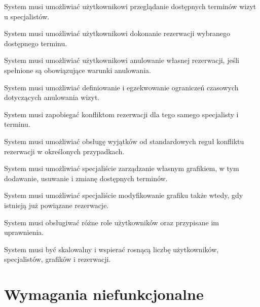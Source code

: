 \documentclass[12pt,a4paper]{article}
\begin{document}
\begin{description}[leftmargin=1.8cm, labelwidth=1.3cm, labelsep=0.5cm, style=nextline]
  \item[FR1] System musi umożliwiać użytkownikowi przeglądanie dostępnych terminów wizyt u specjalistów.
  \item[FR2] System musi umożliwiać użytkownikowi dokonanie rezerwacji wybranego dostępnego terminu.
  \item[FR3] System musi umożliwiać użytkownikowi anulowanie własnej rezerwacji, jeśli spełnione są obowiązujące warunki anulowania.
  \item[FR4] System musi umożliwiać definiowanie i egzekwowanie ograniczeń czasowych dotyczących anulowania wizyt.
  \item[FR5] System musi zapobiegać konfliktom rezerwacji dla tego samego specjalisty i terminu.
  \item[FR6] System musi umożliwiać obsługę wyjątków od standardowych reguł konfliktu rezerwacji w określonych przypadkach.
  \item[FR7] System musi umożliwiać specjaliście zarządzanie własnym grafikiem, w tym dodawanie, usuwanie i zmianę dostępnych terminów.
  \item[FR8] System musi umożliwiać specjaliście modyfikowanie grafiku także wtedy, gdy istnieją już powiązane rezerwacje.
  \item[FR9] System musi obsługiwać różne role użytkowników oraz przypisane im uprawnienia.
  \item[FR10] System musi być skalowalny i wspierać rosnącą liczbę użytkowników, specjalistów, grafików i rezerwacji.
\end{description}

\section{Wymagania niefunkcjonalne}
\end{document}
